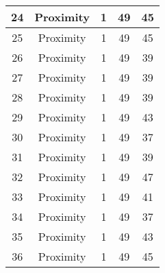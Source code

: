 \documentclass[results.tex]{subfiles}
\begin{document}
\begin{center}
\begin{tabular}{| c || c | c | c | c |}
            \hline
            24                      & Proximity                    & 1                      & 49                      & 45                   \\
            \hline
            25                      & Proximity                    & 1                      & 49                      & 45                   \\
            \hline
            26                      & Proximity                    & 1                      & 49                      & 39                   \\
            \hline
            27                      & Proximity                    & 1                      & 49                      & 39                   \\
            \hline
            28                      & Proximity                    & 1                      & 49                      & 39                   \\
            \hline
            29                      & Proximity                    & 1                      & 49                      & 43                   \\
            \hline
            30                      & Proximity                    & 1                      & 49                      & 37                   \\
            \hline
            31                      & Proximity                    & 1                      & 49                      & 39                   \\
            \hline
            32                      & Proximity                    & 1                      & 49                      & 47                   \\
            \hline
            33                      & Proximity                    & 1                      & 49                      & 41                   \\
            \hline
            34                      & Proximity                    & 1                      & 49                      & 37                   \\
            \hline
            35                      & Proximity                    & 1                      & 49                      & 43                   \\
            \hline
            36                      & Proximity                    & 1                      & 49                      & 45                   \\

\end{tabular}
\end{center}
\end{document}
